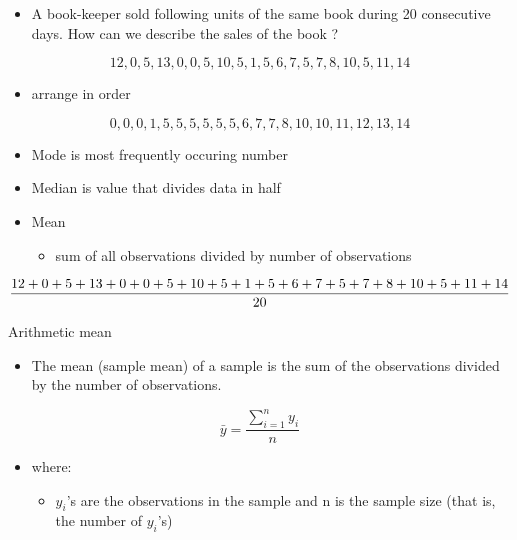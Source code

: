 \documentclass[
  ignorenonframetext,
  aspectratio=169]{beamer}
\providecommand{\tightlist}{%
  \setlength{\itemsep}{0pt}\setlength{\parskip}{0pt}}
\begin{document}
\begin{frame}{}
\protect\hypertarget{section-1}{}
\footnotesize

\begin{itemize}
\tightlist
\item
  A book-keeper sold following units of the same book during 20
  consecutive days. How can we describe the sales of the book ?
\end{itemize}

\[
12, 0, 5, 13, 0, 0, 5, 10, 5, 1, 5, 6, 7, 5, 7, 8, 10, 5, 11,14
\]

\begin{itemize}
\tightlist
\item
  arrange in order
\end{itemize}

\[
0, 0, 0, 1, 5, 5, 5, 5, 5, 5, 6 , 7, 7, 8, 10, 10, 11, 12, 13, 14
\]

\begin{itemize}
\tightlist
\item
  Mode is most frequently occuring number
\item
  Median is value that divides data in half
\item
  Mean

  \begin{itemize}
  \tightlist
  \item
    sum of all observations divided by number of observations
  \end{itemize}
\end{itemize}

\[
\small
\frac{12 + 0 + 5 + 13 + 0 + 0 + 5 + 10 + 5 + 1 + 5 + 6 + 7 + 5 + 7 + 8 + 10 + 5 + 11 +14}{20}
\]
\end{frame}

\begin{frame}{Arithmetic mean}
\protect\hypertarget{arithmetic-mean}{}
\begin{itemize}
\tightlist
\item
  The mean (sample mean) of a sample is the sum of the observations
  divided by the number of observations.
\end{itemize}

\[
\bar{y} = \frac{\sum_{i=1}^n{y_i}}{n}
\]

\begin{itemize}
\tightlist
\item
  where:

  \begin{itemize}
  \tightlist
  \item
    \(y_i\)'s are the observations in the sample and n is the sample
    size (that is, the number of \(y_i\)'s)
  \end{itemize}
\end{itemize}
\end{frame}
\end{document}
